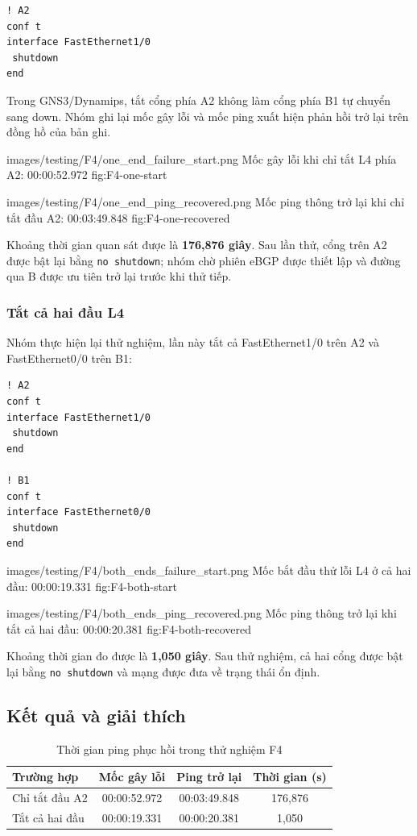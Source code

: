 \begin{lstlisting}
! A2
conf t
interface FastEthernet1/0
 shutdown
end
\end{lstlisting}

Trong GNS3/Dynamips, tắt cổng phía A2
không làm cổng phía B1 tự chuyển sang down.
Nhóm ghi lại mốc gây lỗi và mốc ping
xuất hiện phản hồi trở lại trên đồng hồ của bản ghi.

\partzeroimage
{images/testing/F4/one_end_failure_start.png}
{Mốc gây lỗi khi chỉ tắt L4 phía A2: 00:00:52.972}
{fig:F4-one-start}

\partzeroimage
{images/testing/F4/one_end_ping_recovered.png}
{Mốc ping thông trở lại khi chỉ tắt đầu A2: 00:03:49.848}
{fig:F4-one-recovered}

Khoảng thời gian quan sát được là
\textbf{176,876 giây}.
Sau lần thử, cổng trên A2 được bật lại
bằng \texttt{no shutdown}; nhóm chờ
phiên eBGP được thiết lập và đường qua B
được ưu tiên trở lại trước khi thử tiếp.

\subsubsection{Tắt cả hai đầu L4}

Nhóm thực hiện lại thử nghiệm,
lần này tắt cả FastEthernet1/0 trên A2
và FastEthernet0/0 trên B1:

\begin{lstlisting}
! A2
conf t
interface FastEthernet1/0
 shutdown
end

! B1
conf t
interface FastEthernet0/0
 shutdown
end
\end{lstlisting}

\partzeroimage
{images/testing/F4/both_ends_failure_start.png}
{Mốc bắt đầu thử lỗi L4 ở cả hai đầu: 00:00:19.331}
{fig:F4-both-start}

\partzeroimage
{images/testing/F4/both_ends_ping_recovered.png}
{Mốc ping thông trở lại khi tắt cả hai đầu: 00:00:20.381}
{fig:F4-both-recovered}

Khoảng thời gian đo được là
\textbf{1,050 giây}.
Sau thử nghiệm, cả hai cổng được bật lại
bằng \texttt{no shutdown} và mạng được
đưa về trạng thái ổn định.

\subsection{Kết quả và giải thích}

\begin{table}[H]
\centering
\caption{Thời gian ping phục hồi trong thử nghiệm F4}
\label{tab:F4-results}
\small
\renewcommand{\arraystretch}{1.3}
\begin{tabularx}{\textwidth}{X c c c}
\toprule
\textbf{Trường hợp} &
\textbf{Mốc gây lỗi} &
\textbf{Ping trở lại} &
\textbf{Thời gian (s)} \\
\midrule
Chỉ tắt đầu A2 & 00:00:52.972 & 00:03:49.848 & 176,876 \\
Tắt cả hai đầu & 00:00:19.331 & 00:00:20.381 & 1,050 \\
\bottomrule
\end{tabularx}
\end{table}

